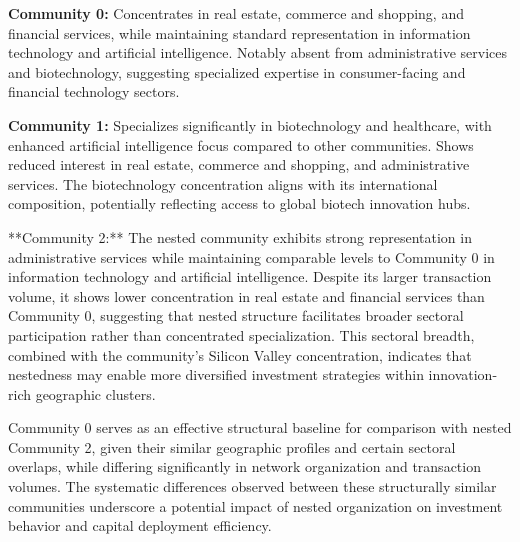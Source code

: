 
\textbf{Community 0:} Concentrates in real estate, commerce and shopping, and financial services, while maintaining standard representation in information technology and artificial intelligence. Notably absent from administrative services and biotechnology, suggesting specialized expertise in consumer-facing and financial technology sectors.

\textbf{Community 1:} Specializes significantly in biotechnology and healthcare, with enhanced artificial intelligence focus compared to other communities. Shows reduced interest in real estate, commerce and shopping, and administrative services. The biotechnology concentration aligns with its international composition, potentially reflecting access to global biotech innovation hubs.

**Community 2:** The nested community exhibits strong representation in administrative services while maintaining comparable levels to Community 0 in information technology and artificial intelligence. Despite its larger transaction volume, it shows lower concentration in real estate and financial services than Community 0, suggesting that nested structure facilitates broader sectoral participation rather than concentrated specialization. This sectoral breadth, combined with the community's Silicon Valley concentration, indicates that nestedness may enable more diversified investment strategies within innovation-rich geographic clusters.

Community 0 serves as an effective structural baseline for comparison with nested Community 2, given their similar geographic profiles and certain sectoral overlaps, while differing significantly in network organization and transaction volumes. The systematic differences observed between these structurally similar communities underscore a potential impact of nested organization on investment behavior and capital deployment efficiency.

